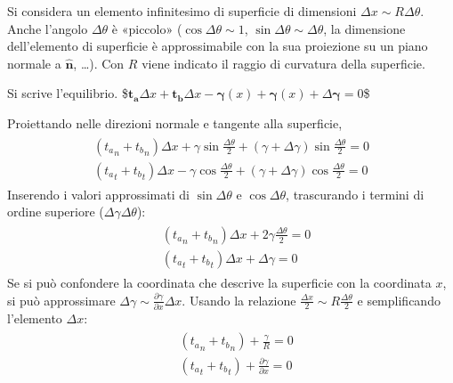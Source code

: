 \documentclass[letterpaper,10pt,italian]{jupyterBook}
\begin{document}
\sphinxAtStartPar
Si considera un elemento infinitesimo di superficie di dimensioni
\(\Delta x \sim R \Delta \theta\). Anche l’angolo \(\Delta \theta\) è
«piccolo» (\(\cos \Delta \theta \sim 1\),
\(\sin \Delta\theta \sim \Delta\theta\), la dimensione dell’elemento di
superficie è approssimabile con la sua proiezione su un piano normale a
\(\mathbf{\hat{n}}\), …). Con \(R\) viene indicato il raggio di curvatura
della superficie.

\sphinxAtStartPar
Si scrive l’equilibrio.
\$\(\mathbf{t_a} \Delta x + \mathbf{t_b} \Delta x - \mathbf{\gamma}(x) + \mathbf{\gamma}(x) + \Delta \mathbf{\gamma} = 0\)\$

\sphinxAtStartPar
Proiettando nelle direzioni normale e tangente alla superficie,
\begin{equation*}
\begin{split}\begin{aligned}
  ( {t_a}_n + {t_b}_n )\Delta x + \gamma \sin \frac{\Delta\theta}{2}
      + (\gamma + \Delta \gamma) \sin \frac{\Delta\theta}{2} = 0 \\
  ( {t_a}_t + {t_b}_t )\Delta x - \gamma \cos \frac{\Delta\theta}{2}
      + (\gamma + \Delta \gamma) \cos\frac{\Delta \theta}{2} = 0
 \end{aligned}\end{split}
\end{equation*}
\sphinxAtStartPar
Inserendo i valori approssimati di \(\sin \Delta \theta\) e
\(\cos \Delta \theta\), trascurando i termini di ordine superiore
(\(\Delta \gamma \Delta \theta\)):
\begin{equation*}
\begin{split}\begin{aligned}
  & ( {t_a}_n + {t_b}_n )\Delta x + 2 \gamma \frac{\Delta \theta}{2} = 0 \\
  & ( {t_a}_t + {t_b}_t )\Delta x + \Delta \gamma = 0
 \end{aligned}\end{split}
\end{equation*}
\sphinxAtStartPar
Se si può confondere la coordinata che descrive la superficie con la
coordinata \(x\), si può approssimare
\(\Delta \gamma \sim \frac{\partial \gamma}{\partial x} \Delta x\). Usando
la relazione \(\frac{\Delta x}{2} \sim R \frac{\Delta \theta}{2}\) e
semplificando l’elemento \(\Delta x\):
\begin{equation*}
\begin{split}\label{eqn:equil_young_laplace}
\begin{aligned}
 & ( {t_a}_n + {t_b}_n ) + \frac{\gamma}{R} = 0 \\
 & ( {t_a}_t + {t_b}_t ) + \frac{\partial \gamma}{\partial x} = 0
\end{aligned}\end{split}
\end{equation*}
\end{document}
